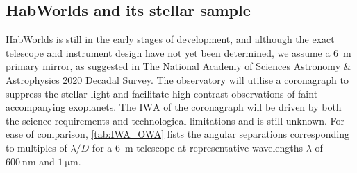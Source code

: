 \documentclass[
    usenatbib,
]{mnras}
\newcommand{\IWA}{\ensuremath{\mathrm{IWA}}}
\newcommand{\hwo}{HabWorlds}
\begin{document}
\subsection{\hwo{} and its stellar sample}
\label{subsec:2.1}

\hwo{} is still in the early stages of development, and although the exact telescope and instrument design have not yet been determined, we assume a \qty{6}{\meter} primary mirror, as suggested in The National Academy of Sciences Astronomy \& Astrophysics 2020 Decadal Survey.
%
The observatory will utilise a coronagraph to suppress the stellar light and facilitate high-contrast observations of faint accompanying exoplanets. 
%
The \IWA{} of the coronagraph will be driven by both the science requirements and technological limitations and is still unknown.
For ease of comparison, \cref{tab:IWA_OWA} lists the angular separations corresponding to multiples of $\lambda / D$ for a \qty{6}{\meter} telescope at representative wavelengths $\lambda$ of $\qty{600}{\nano\meter}$ and $\qty{1}{\micro\meter}$.
\end{document}
